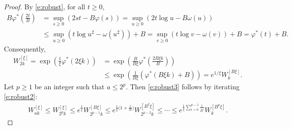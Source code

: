 \documentclass[10pt,a4paper]{amsart}
\def\om{\omega}
\def\vh{\varphi}
\begin{document}
\begin{proof}
    By \eqref{e:robust}, for all $t\ge 0$,
    \begin{align*}
        B \vh^*(\tfrac{2t}{B}) &= \sup_{s\ge 0} (2s t - B\vh(s)) = \sup_{u\ge 0} (2 t \log u - B\om(u)) 
        \\
                               &\le \sup_{u\ge 0} (t \log u^2 - \om(u^2)) +B = \sup_{v\ge 0} (t \log v - \om(v)) +B 
                               = \vh^*(t) +B. 
    \end{align*}
    Consequently,
    \begin{align*}
        W^{[\xi]}_{2k} = \exp(\tfrac{1}{\xi} \vh^*(2\xi k)) 
        &= \exp(\tfrac{B}{B\xi} \vh^*(\tfrac{2 B\xi k}{B})) 
        \\
        &\le \exp(\tfrac{1}{B\xi} (\vh^*(B\xi k)+B)) = e^{1/\xi} W^{[B\xi]}_k.
    \end{align*}
    Let $p\ge 1$ be an integer such that $a \le 2^p$. 
    Then \eqref{e:robust3} follows by iterating \eqref{e:robust2}:
    \begin{align*}
        W^{[\xi]}_{ak} \le W^{[\xi]}_{2^pk} \le e^{\tfrac{1}{\xi}} W^{[B\xi]}_{2^{p-1}k} 
        \le e^{\tfrac{1}{\xi}\big(1+\tfrac{1}{B}\big)} W^{[B^2\xi]}_{2^{p-2}k} \le 
        \cdots \le e^{\tfrac{1}{\xi} \sum_{i=0}^{p-1}\tfrac{1}{B^i}}  W^{[B^p\xi]}_{k}.
    \end{align*}
\end{proof}
\end{document}
